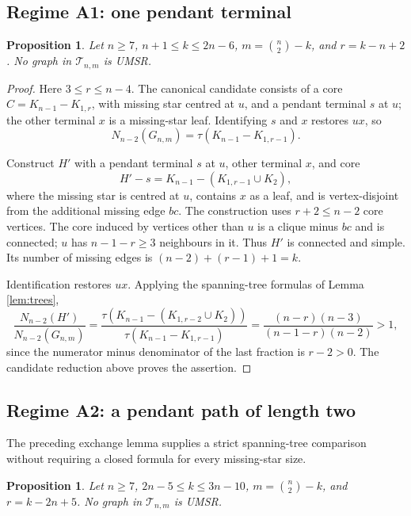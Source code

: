 \documentclass[
  11pt,
]{article}
\newtheorem{proposition}[theorem]{Proposition}
\theoremstyle{definition}
\theoremstyle{remark}
\begin{document}
\subsection{Regime A1: one pendant
terminal}\label{regime-a1-one-pendant-terminal}

\begin{proposition}\label{prop:A1comp}
Let $n\ge7$, $n+1\le k\le2n-6$, $m=\binom n2-k$, and $r=k-n+2$. No graph in $\mathcal T_{n,m}$ is UMSR.
\end{proposition}

\begin{proof}
Here $3\le r\le n-4$. The canonical candidate consists of a core $C=K_{n-1}-K_{1,r}$, with missing star centred at $u$, and a pendant terminal $s$ at $u$; the other terminal $x$ is a missing-star leaf. Identifying $s$ and $x$ restores $ux$, so
$$N_{n-2}(G_{n,m})=\tau(K_{n-1}-K_{1,r-1}).$$

Construct $H'$ with a pendant terminal $s$ at $u$, other terminal $x$, and core
$$H'-s=K_{n-1}-(K_{1,r-1}\cup K_2),$$
where the missing star is centred at $u$, contains $x$ as a leaf, and is vertex-disjoint from the additional missing edge $bc$. The construction uses $r+2\le n-2$ core vertices. The core induced by vertices other than $u$ is a clique minus $bc$ and is connected; $u$ has $n-1-r\ge3$ neighbours in it. Thus $H'$ is connected and simple. Its number of missing edges is $(n-2)+(r-1)+1=k$.

Identification restores $ux$. Applying the spanning-tree formulas of Lemma \ref{lem:trees},
$$\frac{N_{n-2}(H')}{N_{n-2}(G_{n,m})}
=\frac{\tau(K_{n-1}-(K_{1,r-2}\cup K_2))}{\tau(K_{n-1}-K_{1,r-1})}
=\frac{(n-r)(n-3)}{(n-1-r)(n-2)}>1,$$
since the numerator minus denominator of the last fraction is $r-2>0$. The candidate reduction above proves the assertion.
\end{proof}

\subsection{Regime A2: a pendant path of length
two}\label{regime-a2-a-pendant-path-of-length-two}

The preceding exchange lemma supplies a strict spanning-tree comparison
without requiring a closed formula for every missing-star size.

\begin{proposition}\label{prop:A2comp}
Let $n\ge7$, $2n-5\le k\le3n-10$, $m=\binom n2-k$, and $r=k-2n+5$. No graph in $\mathcal T_{n,m}$ is UMSR.
\end{proposition}
\end{document}
